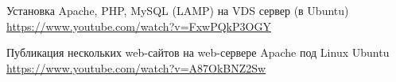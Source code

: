 \newpage

\begin{thebibliography}{9}
		Установка Apache, PHP, MySQL (LAMP) на VDS сервер (в Ubuntu)
		\\\url{https://www.youtube.com/watch?v=FxwPQkP3OGY}

		Публикация нескольких web-сайтов на web-сервере Apache под Linux Ubuntu
		\\\url{https://www.youtube.com/watch?v=A87OkBNZ2Sw}

\end{thebibliography}
